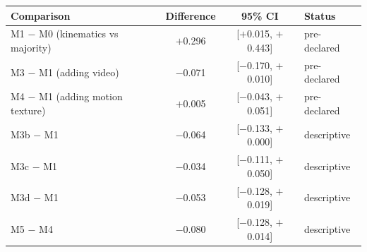 \begin{tabular}{@{}l c c l@{}}
\toprule
Comparison & Difference & 95\% CI & Status \\
\midrule
M1 $-$ M0 (kinematics vs majority) & $+$0.296 & [$+$0.015, $+$0.443] & pre-declared \\
M3 $-$ M1 (adding video) & $-$0.071 & [$-$0.170, $+$0.010] & pre-declared \\
M4 $-$ M1 (adding motion texture) & $+$0.005 & [$-$0.043, $+$0.051] & pre-declared \\
M3b $-$ M1 & $-$0.064 & [$-$0.133, $+$0.000] & descriptive \\
M3c $-$ M1 & $-$0.034 & [$-$0.111, $+$0.050] & descriptive \\
M3d $-$ M1 & $-$0.053 & [$-$0.128, $+$0.019] & descriptive \\
M5 $-$ M4 & $-$0.080 & [$-$0.128, $+$0.014] & descriptive \\
\bottomrule
\end{tabular}
